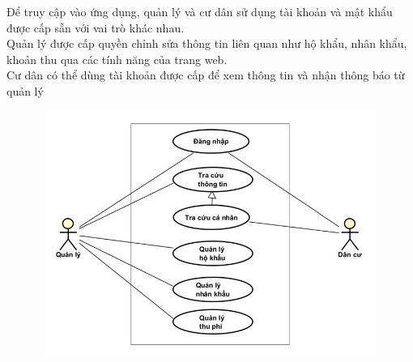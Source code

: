 \documentclass{article}
\begin{document}
Để truy cập vào ứng dụng, quản lý và cư dân sử dụng tài khoản và mật khẩu được cấp sẵn với vai trò khác nhau. \\
Quản lý được cấp quyền chỉnh sửa thông tin liên quan như hộ khẩu, nhân khẩu, khoản thu qua các tính năng của trang web.\\
Cư dân có thể dùng tài khoản được cấp để xem thông tin và nhận thông báo từ quản lý
\begin{figure}[H]
    \centering
    \includegraphics[width=12.53cm, height = 8cm]{Ảnh chương 2/Tổng quát.jpg}
\end{figure}
\end{document}
